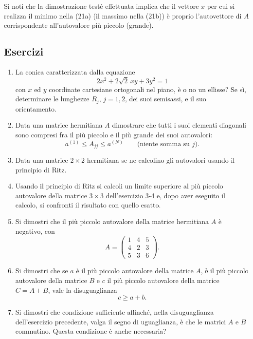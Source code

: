 \documentclass[11pt, a4paper]{book}
\numberwithin{equation}{section}
\newenvironment{esercizi}{\subsection*{Esercizi}\begin{enumerate}}{\end{enumerate}}
\begin{document}
Si noti che la dimostrazione testé effettuata implica che il vettore $x$
per cui si realizza il minimo nella (21a) (il massimo nella (21b)) è
proprio l'autovettore di $A$ corrispondente all'autovalore più piccolo
(grande).

\begin{esercizi}

\item La conica caratterizzata dalla equazione
\[
2x^2 + 2\sqrt{2}\,xy + 3y^2 = 1
\]
con $x$ ed $y$ coordinate cartesiane ortogonali nel piano, è o no un
ellisse? Se sì, determinare le lunghezze $R_j$, $j=1,2$, dei suoi
semisassi, e il suo orientamento.


\item Data una matrice hermitiana $A$ dimostrare che tutti i suoi elementi
diagonali sono compresi fra il più piccolo e il più grande dei suoi
autovalori:
\[
a^{(1)} \leq A_{jj} \leq a^{(N)} \qquad \text{(niente somma su }j\text{)}.
\]

\item Data una matrice $2\times2$ hermitiana se ne calcolino gli autovalori
usando il principio di Ritz.

\item Usando il principio di Ritz si calcoli un limite superiore al più
piccolo autovalore della matrice $3\times3$ dell'esercizio 3-4 e, dopo aver
eseguito il calcolo, si confronti il risultato con quello esatto.

\item Si dimostri che il più piccolo autovalore della matrice hermitiana $A$
è negativo, con
\[
A = \begin{pmatrix} 1 & 4 & 5 \\ 4 & 2 & 3 \\ 5 & 3 & 6 \end{pmatrix}.
\]

\item Si dimostri che se $a$ è il più piccolo autovalore della matrice $A$,
$b$ il più piccolo autovalore della matrice $B$ e $c$ il più piccolo
autovalore della matrice $C = A + B$, vale la disuguaglianza
\[
c \geq a + b.
\]

\item Si dimostri che condizione sufficiente affinché, nella disuguaglianza
dell'esercizio precedente, valga il segno di uguaglianza, è che le matrici
$A$ e $B$ commutino. Questa condizione è anche necessaria?


\end{esercizi}
\end{document}
